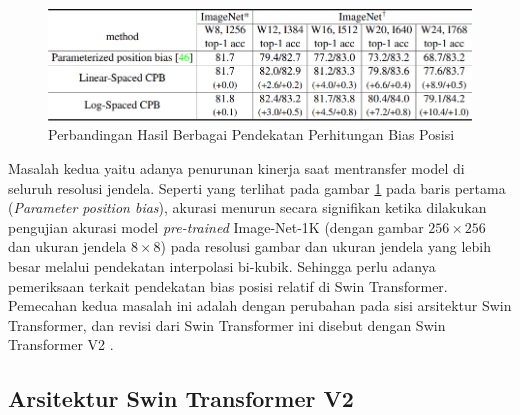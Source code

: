\begin{figure}[ht]
  \centering
  \includegraphics[scale=0.75]{gambar/Penurunan kinerja Swin v1.png}
  \caption{Perbandingan Hasil Berbagai Pendekatan Perhitungan Bias Posisi}
  \label{fig:perbandinganberbagaihasilpendekatanperhitunganbiasposisi}
\end{figure}

Masalah kedua yaitu adanya penurunan kinerja saat mentransfer model di seluruh resolusi jendela. Seperti yang terlihat pada gambar \ref{fig:perbandinganberbagaihasilpendekatanperhitunganbiasposisi} pada baris pertama (\emph{Parameter position bias}), akurasi menurun secara 
signifikan ketika dilakukan pengujian akurasi model \emph{pre-trained} Image-Net-1K (dengan gambar \begin{math}256\times256\end{math} dan ukuran jendela \begin{math}8\times8\end{math}) pada resolusi gambar dan ukuran 
jendela yang lebih besar melalui pendekatan interpolasi bi-kubik. Sehingga perlu adanya pemeriksaan terkait pendekatan bias posisi relatif di Swin Transformer. Pemecahan kedua masalah ini adalah dengan perubahan 
pada sisi arsitektur Swin Transformer, dan revisi dari Swin Transformer ini disebut dengan Swin Transformer V2 \parencite{Liuv22021}.

\subsection{Arsitektur Swin Transformer V2}

